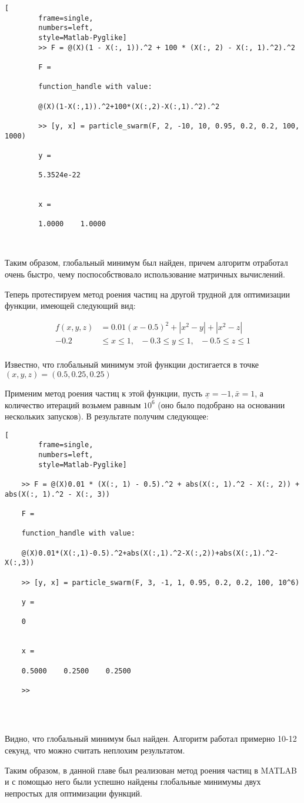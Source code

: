 \documentclass[../main.tex]{subfiles}
\begin{document}
	\begin{lstlisting}[
		frame=single,
		numbers=left,
		style=Matlab-Pyglike]
		>> F = @(X)(1 - X(:, 1)).^2 + 100 * (X(:, 2) - X(:, 1).^2).^2
		
		F =
		
		function_handle with value:
		
		@(X)(1-X(:,1)).^2+100*(X(:,2)-X(:,1).^2).^2
		
		>> [y, x] = particle_swarm(F, 2, -10, 10, 0.95, 0.2, 0.2, 100, 1000)
		
		y =
		
		5.3524e-22
		
		
		x =
		
		1.0000    1.0000
		
		
	\end{lstlisting}
	
	Таким образом, глобальный минимум был найден, причем алгоритм отработал очень быстро, чему поспособствовало использование матричных вычислений.
	
	Теперь протестируем метод роения частиц на другой трудной для оптимизации функции, имеющей следующий вид:
	
	\[\begin{aligned}
		f(x, y, z) &= 0.01(x-0.5)^2 + |x^2-y| + |x^2 - z| \\
		-0.2 &\leqslant x \leqslant 1, \text{ } -0.3 \leqslant y \leqslant 1, \text{ }
		 -0.5 \leqslant z \leqslant 1 \\
	\end{aligned}\]

	Известно, что глобальный минимум этой функции достигается в точке $(x, y, z) = (0.5, 0.25, 0.25)$
	
	Применим метод роения частиц к этой функции, пусть $\underline{x} = -1,  \bar{x} = 1$, а количество итераций возьмем равным $10^6$ (оно было подобрано на основании нескольких запусков). В результате получим следующее:
	
	\begin{lstlisting}[
		frame=single,
		numbers=left,
		style=Matlab-Pyglike]
	
	>> F = @(X)0.01 * (X(:, 1) - 0.5).^2 + abs(X(:, 1).^2 - X(:, 2)) + abs(X(:, 1).^2 - X(:, 3))
	
	F =
	
	function_handle with value:
	
	@(X)0.01*(X(:,1)-0.5).^2+abs(X(:,1).^2-X(:,2))+abs(X(:,1).^2-X(:,3))
	
	>> [y, x] = particle_swarm(F, 3, -1, 1, 0.95, 0.2, 0.2, 100, 10^6)
	
	y =
	
	0
	
	
	x =
	
	0.5000    0.2500    0.2500
	
	>> 
	
		
		
	\end{lstlisting}

	Видно, что глобальный минимум был найден. Алгоритм работал примерно 10-12 секунд, что можно считать неплохим результатом.
	
	Таким образом, в данной главе был реализован метод роения частиц в MATLAB и с помощью него были успешно найдены глобальные минимумы двух непростых для оптимизации функций.
\end{document}
